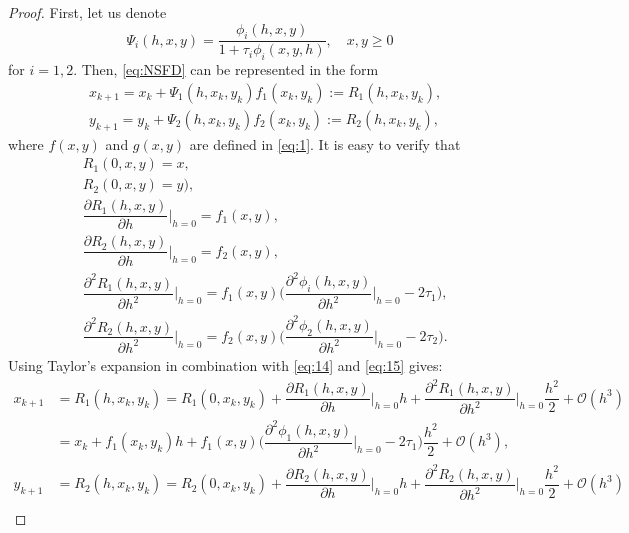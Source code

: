\documentclass[12pt]{article}
\theoremstyle{definition}
\theoremstyle{remark}
\numberwithin{equation}{section}
\begin{document}
\begin{proof}
First, let us denote
\begin{equation*}
\Psi_i(h, x, y) = \dfrac{\phi_i(h, x, y)}{1 + \tau_i\phi_i(x, y, h)}, \quad x, y \geq 0
\end{equation*}
for $i = 1, 2$. Then, \eqref{eq:NSFD} can be represented in the form
\begin{equation}\label{eq:14}
\begin{split}
&x_{k + 1} = x_k + \Psi_1(h, x_k, y_k)f_1(x_k, y_k) := R_1(h, x_k, y_k),\\
&y_{k + 1} = y_k + \Psi_2(h, x_k, y_k)f_2(x_k, y_k) := R_2(h, x_k, y_k),
\end{split}
\end{equation} 
where $f(x, y)$ and $g(x, y)$ are defined in \eqref{eq:1}. It is easy to verify that
\begin{equation}\label{eq:15}
\begin{split}
&R_1(0, x, y) = x,\\
&R_2(0, x, y) = y),\\
&\dfrac{\partial R_1(h, x, y)}{\partial h}\bigg|_{h = 0} = f_1(x, y),\\
&\dfrac{\partial R_2(h, x, y)}{\partial h}\bigg|_{h = 0} = f_2(x, y),\\
&\dfrac{\partial^2 R_1(h, x, y)}{\partial h^2}\bigg|_{h = 0} = f_1(x, y)\bigg(\dfrac{\partial^2 \phi_i(h, x, y)}{\partial h^2}\Big|_{h = 0} - 2\tau_1\bigg),\\
&\dfrac{\partial^2 R_2(h, x, y)}{\partial h^2}\bigg|_{h = 0} = f_2(x, y)\bigg(\dfrac{\partial^2 \phi_2(h, x, y)}{\partial h^2}\Big|_{h = 0} - 2\tau_2\bigg).
\end{split}
\end{equation}
Using Taylor's expansion in combination with \eqref{eq:14} and \eqref{eq:15} gives:\\
\begin{equation}\label{eq:16}
\begin{split}
x_{k + 1} &= R_1(h, x_k, y_k) = R_1(0, x_k, y_k) + \dfrac{\partial R_1(h, x, y)}{\partial h}\bigg|_{h = 0}h + \dfrac{\partial^2 R_1(h, x, y)}{\partial h^2}\bigg|_{h = 0} \dfrac{h^2}{2} + \mathcal{O}(h^3)\\
&= x_k + f_1(x_k, y_k)h + f_1(x, y)\bigg(\dfrac{\partial^2 \phi_1(h, x, y)}{\partial h^2}\bigg|_{h = 0} - 2\tau_1\bigg)\dfrac{h^2}{2} + \mathcal{O}(h^3),\\
y_{k + 1} &= R_2(h, x_k, y_k) = R_2(0, x_k, y_k) + \dfrac{\partial R_2(h, x, y)}{\partial h}\bigg|_{h = 0}h + \dfrac{\partial^2 R_2(h, x, y)}{\partial h^2}\bigg|_{h = 0} \dfrac{h^2}{2} + \mathcal{O}(h^3)\\

\end{split}
\end{equation}
\end{proof}
\end{document}
